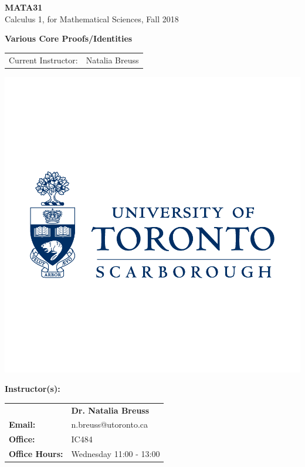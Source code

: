 \documentclass{article}
\begin{document}
\begin{titlepage}
\begin{center}
  \vspace{5cm}

  {\textbf{MATA31}}\\

  Calculus 1, for Mathematical Sciences, Fall 2018

  \hrulefill
  \vspace{0.3cm}

  \textbf{\huge Various Core Proofs/Identities}

  \hrulefill

  \begin{tabular}{ll}
  Current Instructor: & Natalia Breuss\\
  \end{tabular}

  \vspace{0.5cm}

  \includegraphics[scale = 0.25]{UTSC}

  \vspace{5cm}

  \end{center}

  \textbf{Instructor(s):}

  \begin{center}

  \begin{tabular}{ll}
   &\textbf{Dr. Natalia Breuss}\\
  \textbf{Email:} & n.breuss@utoronto.ca\\
  \textbf{Office:} & IC484\\
  \textbf{Office Hours:}& Wednesday 11:00 - 13:00\\
  \end{tabular}

  \end{center}

\end{titlepage}
\pagestyle{fancy}
\end{document}
